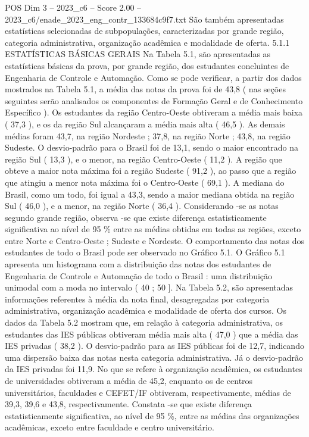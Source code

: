 \begin{textsample}{POS Dim 3 – 2023\_c6 – Score 2.00 – 2023\_c6/enade\_2023\_eng\_contr\_133684c9f7.txt}
São também apresentadas estatísticas selecionadas de subpopulações, caracterizadas por grande região, categoria administrativa, organização acadêmica e modalidade de oferta. 5.1.1 ESTATÍSTICAS BÁSICAS GERAIS Na Tabela 5.1, são apresentadas as estatísticas básicas da prova, por grande região, dos estudantes concluintes de Engenharia de Controle e Automação.
Como se pode verificar, a partir dos dados mostrados na Tabela 5.1, a média das notas da prova foi de 43,8 ( nas seções seguintes serão analisados os componentes de Formação Geral e de Conhecimento Específico ).
Os estudantes da região Centro-Oeste obtiveram a média mais baixa ( 37,3 ), e os da região Sul alcançaram a média mais alta ( 46,5 ).
As demais médias foram 43,7, na região Nordeste ; 37,8, na região Norte ; 43,8, na região Sudeste.
O desvio-padrão para o Brasil foi de 13,1, sendo o maior encontrado na região Sul ( 13,3 ), e o menor, na região Centro-Oeste ( 11,2 ).
A região que obteve a maior nota máxima foi a região Sudeste ( 91,2 ), ao passo que a região que atingiu a menor nota máxima foi o Centro-Oeste ( 69,1 ).
A mediana do Brasil, como um todo, foi igual a 43,3, sendo a maior mediana obtida na região Sul ( 46,0 ), e a menor, na região Norte ( 36,4 ).
Considerando -se as notas segundo grande região, observa -se que existe diferença estatisticamente significativa ao nível de 95 \% entre as médias obtidas em todas as regiões, exceto entre Norte e Centro-Oeste ; Sudeste e Nordeste.
O comportamento das notas dos estudantes de todo o Brasil pode ser observado no Gráfico 5.1.
O Gráfico 5.1 apresenta um histograma com a distribuição das notas dos estudantes de Engenharia de Controle e Automação de todo o Brasil : uma distribuição unimodal com a moda no intervalo ( 40 ; 50 ].
Na Tabela 5.2, são apresentadas informações referentes à média da nota final, desagregadas por categoria administrativa, organização acadêmica e modalidade de oferta dos cursos.
Os dados da Tabela 5.2 mostram que, em relação à categoria administrativa, os estudantes das IES públicas obtiveram média mais alta ( 47,0 ) que a média das IES privadas ( 38,2 ).
O desvio-padrão para as IES públicas foi de 12,7, indicando uma dispersão baixa das notas nesta categoria administrativa.
Já o desvio-padrão da IES privadas foi 11,9.
No que se refere à organização acadêmica, os estudantes de universidades obtiveram a média de 45,2, enquanto os de centros universitários, faculdades e CEFET/IF obtiveram, respectivamente, médias de 39,3, 39,6 e 43,8, respectivamente.
Constata -se que existe diferença estatisticamente significativa, ao nível de 95 \%, entre as médias das organizações acadêmicas, exceto entre faculdade e centro universitário.

\end{textsample}
